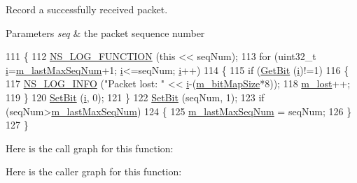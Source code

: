 Record a successfully received packet. 


\begin{DoxyParams}{Parameters}
{\em seq} & the packet sequence number \\
\hline
\end{DoxyParams}

\begin{DoxyCode}
111 \{
112   \hyperlink{log-macros-disabled_8h_a90b90d5bad1f39cb1b64923ea94c0761}{NS\_LOG\_FUNCTION} (\textcolor{keyword}{this} << seqNum);
113   \textcolor{keywordflow}{for} (uint32\_t \hyperlink{bernuolliDistribution_8m_a6f6ccfcf58b31cb6412107d9d5281426}{i}=\hyperlink{classns3_1_1PacketLossCounter_a4d24c5d85acd4bcaa976d0e2e9ebcc8d}{m\_lastMaxSeqNum}+1; \hyperlink{bernuolliDistribution_8m_a6f6ccfcf58b31cb6412107d9d5281426}{i}<=seqNum; \hyperlink{bernuolliDistribution_8m_a6f6ccfcf58b31cb6412107d9d5281426}{i}++)
114     \{
115       \textcolor{keywordflow}{if} (\hyperlink{classns3_1_1PacketLossCounter_a548b759d404415f50111047786ee09d0}{GetBit} (\hyperlink{bernuolliDistribution_8m_a6f6ccfcf58b31cb6412107d9d5281426}{i})!=1)
116         \{
117           \hyperlink{group__logging_gafbd73ee2cf9f26b319f49086d8e860fb}{NS\_LOG\_INFO} (\textcolor{stringliteral}{"Packet lost: "} << \hyperlink{bernuolliDistribution_8m_a6f6ccfcf58b31cb6412107d9d5281426}{i}-(\hyperlink{classns3_1_1PacketLossCounter_afb7f1479593f5ffe9352772e8a37dfa1}{m\_bitMapSize}*8));
118           \hyperlink{classns3_1_1PacketLossCounter_a764928ff787c0586db03f92f1e7babb1}{m\_lost}++;
119         \}
120       \hyperlink{classns3_1_1PacketLossCounter_a196384cef20a0a9134ff61f505773d71}{SetBit} (\hyperlink{bernuolliDistribution_8m_a6f6ccfcf58b31cb6412107d9d5281426}{i}, 0);
121     \}
122   \hyperlink{classns3_1_1PacketLossCounter_a196384cef20a0a9134ff61f505773d71}{SetBit} (seqNum, 1);
123   \textcolor{keywordflow}{if} (seqNum>\hyperlink{classns3_1_1PacketLossCounter_a4d24c5d85acd4bcaa976d0e2e9ebcc8d}{m\_lastMaxSeqNum})
124     \{
125       \hyperlink{classns3_1_1PacketLossCounter_a4d24c5d85acd4bcaa976d0e2e9ebcc8d}{m\_lastMaxSeqNum} = seqNum;
126     \}
127 \}
\end{DoxyCode}


Here is the call graph for this function\+:




Here is the caller graph for this function\+:


